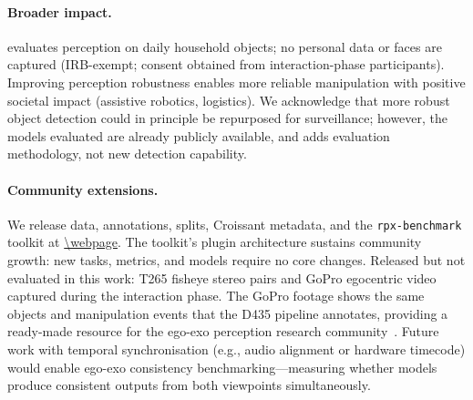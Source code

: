 \paragraph{Broader impact.}
\coolname{} evaluates perception on daily household objects; no personal data or faces are captured (IRB-exempt; consent obtained from interaction-phase participants).
Improving perception robustness enables more reliable manipulation with positive societal impact (assistive robotics, logistics).
We acknowledge that more robust object detection could in principle be repurposed for surveillance; however, the models evaluated are already publicly available, and \coolname{} adds evaluation methodology, not new detection capability.

\paragraph{Community extensions.}
We release data, annotations, splits, Croissant metadata, and the \texttt{rpx-benchmark} toolkit at \url{\webpage}.
The toolkit's plugin architecture sustains community growth: new tasks, metrics, and models require no core changes.
Released but not evaluated in this work: T265 fisheye stereo pairs and GoPro egocentric video captured during the interaction phase.
The GoPro footage shows the same objects and manipulation events that the D435 pipeline annotates, providing a ready-made resource for the ego-exo perception research community~\citep{nair2022r3m, kareer2024egomimic, shaw2025egodex}.
Future work with temporal synchronisation (e.g., audio alignment or hardware timecode) would enable ego-exo consistency benchmarking---measuring whether models produce consistent outputs from both viewpoints simultaneously.
